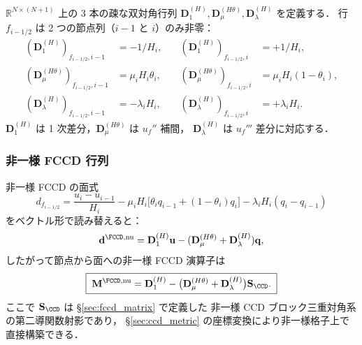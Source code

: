 $\mathbb{R}^{N\times(N+1)}$ 上の
3 本の疎な双対角行列 $\mathbf{D}_1^{(H)}, \mathbf{D}_\mu^{(H\theta)}, \mathbf{D}_\lambda^{(H)}$ を定義する．
行 $f_{i-1/2}$ は 2 つの節点列（$i-1$ と $i$）のみ非零：
\begin{align}
  (\mathbf{D}_1^{(H)})_{f_{i-1/2},i-1} &= -1/H_i,
  &\quad (\mathbf{D}_1^{(H)})_{f_{i-1/2},i} &= +1/H_i, \label{eq:fccd_nu_D1}\\
  (\mathbf{D}_\mu^{(H\theta)})_{f_{i-1/2},i-1} &= \mu_i H_i\theta_i,
  &\quad (\mathbf{D}_\mu^{(H\theta)})_{f_{i-1/2},i} &= \mu_i H_i(1-\theta_i), \label{eq:fccd_nu_Dmu}\\
  (\mathbf{D}_\lambda^{(H)})_{f_{i-1/2},i-1} &= -\lambda_i H_i,
  &\quad (\mathbf{D}_\lambda^{(H)})_{f_{i-1/2},i} &= +\lambda_i H_i. \label{eq:fccd_nu_Dlambda}
\end{align}
$\mathbf{D}_1^{(H)}$ は 1 次差分，$\mathbf{D}_\mu^{(H\theta)}$ は $u_f''$ 補間，
$\mathbf{D}_\lambda^{(H)}$ は $u_f'''$ 差分に対応する．

\subsubsection{非一様 FCCD 行列}
\label{sec:fccd_nu_matrix_form}

非一様 FCCD の面式
\begin{equation}
  d_{f_{i-1/2}} = \frac{u_i - u_{i-1}}{H_i}
    - \mu_i H_i\bigl[\theta_i q_{i-1} + (1-\theta_i)q_i\bigr]
    - \lambda_i H_i(q_i - q_{i-1})
  \label{eq:fccd_nu_face_formula}
\end{equation}
をベクトル形で読み替えると：
\begin{equation}
  \mathbf{d}^{\FCCD,\text{nu}}
  = \mathbf{D}_1^{(H)}\mathbf{u}
   - (\mathbf{D}_\mu^{(H\theta)} + \mathbf{D}_\lambda^{(H)})\mathbf{q},
\end{equation}
したがって節点から面への非一様 FCCD 演算子は
\begin{equation}
  \boxed{\;
  \mathbf{M}^{\FCCD,\text{nu}}
  = \mathbf{D}_1^{(H)}
    - \bigl(\mathbf{D}_\mu^{(H\theta)} + \mathbf{D}_\lambda^{(H)}\bigr)
      \mathbf{S}_{\CCD}.
  \;}
  \label{eq:fccd_nu_composite_matrix}
\end{equation}
ここで $\mathbf{S}_{\CCD}$ は \S\ref{sec:fccd_matrix} で定義した
非一様 CCD ブロック三重対角系の第二導関数射影であり，
\S\ref{sec:ccd_metric} の座標変換により非一様格子上で直接構築できる．

